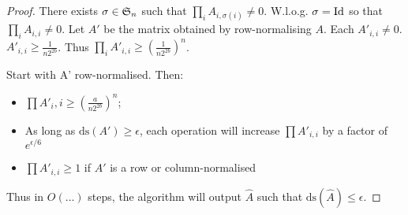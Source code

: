 \begin{proof} There exists $\sigma \in \mathfrak{S}_{n}$ such that $\prod_i A_{i,\sigma(i)} \neq 0$. W.l.o.g. $\sigma=\mathrm{Id}_{}$ so that $\prod_i A_{i,i} \neq 0$. Let $A'$ be the matrix obtained by row-normalising $A$. Each $A'_{i,i}\neq 0$. $A'_{i,i}\geq \frac{1}{n 2^{2b}}$. Thus $\prod_i A'_{i,i}\geq \left( \frac{1}{n 2^{2b}} \right) ^n$.

Start with A' row-normalised. Then:
\begin{itemize}
\item $\prod  A'_i,i \geq \left(\frac{a}{n 2^{2b}}\right)^n$;
\item As long as $\mathrm{ds}(A')\geq \epsilon$, each operation will increase $\prod A'_{i,i}$ by a factor of $e^{\epsilon /6}$
\item $\prod A'_{i,i} \geq 1$ if $A'$ is a row or column-normalised
\end{itemize}
Thus in $O(...)$ steps, the algorithm will output $\hat{A}$ such that $\mathrm{ds}(\hat{A})\leq \epsilon$.
\end{proof}

